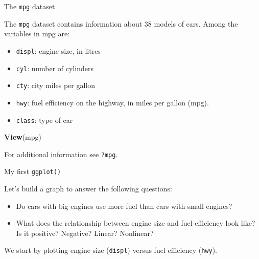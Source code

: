 \documentclass[ignorenonframetext,]{beamer}
\newenvironment{Shaded}{\begin{snugshade}}{\end{snugshade}}
\newcommand{\KeywordTok}[1]{\textcolor[rgb]{0.13,0.29,0.53}{\textbf{#1}}}
\newcommand{\NormalTok}[1]{#1}
\begin{document}
\begin{frame}[fragile]{The \texttt{mpg} dataset}
\protect\hypertarget{the-mpg-dataset}{}

The \texttt{mpg} dataset contains information about 38 models of cars.
Among the variables in mpg are:

\begin{itemize}
\item
  \texttt{displ}: engine size, in litres
\item
  \texttt{cyl}: number of cylinders
\item
  \texttt{cty}: city miles per gallon
\item
  \texttt{hwy}: fuel efficiency on the highway, in miles per gallon
  (mpg).
\item
  \texttt{class}: type of car
\end{itemize}

\begin{Shaded}
\begin{Highlighting}[]
\KeywordTok{View}\NormalTok{(mpg)}
\end{Highlighting}
\end{Shaded}

For additional information see \texttt{?mpg}.

\end{frame}

\begin{frame}[fragile]{My first \texttt{ggplot()}}
\protect\hypertarget{my-first-ggplot}{}

Let's build a graph to answer the following questions:

\begin{itemize}
\item
  Do cars with big engines use more fuel than cars with small engines?
\item
  What does the relationship between engine size and fuel efficiency
  look like? Is it positive? Negative? Linear? Nonlinear?
\end{itemize}

We start by plotting engine size (\texttt{displ}) versus fuel efficiency
(\texttt{hwy}).

\end{frame}
\end{document}
